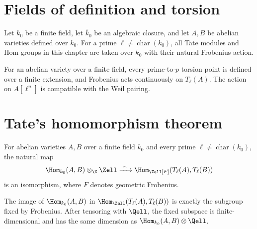 \section{Fields of definition and torsion}
\label{mumford-AppI-setup}

\begin{convention}
\label{mumford-conv-tate-fields}
Let $k_0$ be a finite field, let $\bar k_0$ be an algebraic closure, and let
$A,B$ be abelian varieties defined over $k_0$.  For a prime $\ell\ne
\operatorname{char}(k_0)$, all Tate modules and Hom groups in this chapter
are taken over $\bar k_0$ with their natural Frobenius action.
\notready
\end{convention}

\begin{lemma}
\label{mumford-lem-torsion-defined-over-finite-field}
For an abelian variety over a finite field, every prime-to-$p$ torsion point is
defined over a finite extension, and Frobenius acts continuously on
$T_\ell(A)$.  The action on $A[\ell^n]$ is compatible with the Weil pairing.
\notready
\end{lemma}

\section{Tate's homomorphism theorem}
\label{mumford-AppI-tate-hom}

\begin{theorem}
\label{mumford-thm-tate-hom-isomorphism}
For abelian varieties $A,B$ over a finite field $k_0$ and every prime
$\ell\ne\operatorname{char}(k_0)$, the natural map
\[
 \Hom_{k_0}(A,B)\otimes_\Z\Zell
 \xrightarrow{\ \sim\ }
 \Hom_{\Zell[F]}(T_\ell(A),T_\ell(B))
\]
is an isomorphism, where $F$ denotes geometric Frobenius.
\notready
\end{theorem}

\begin{lemma}
\label{mumford-lem-frobenius-fixed-hom}
The image of $\Hom_{k_0}(A,B)$ in
$\Hom_{\Zell}(T_\ell(A),T_\ell(B))$ is exactly the subgroup fixed by Frobenius.
After tensoring with $\Qell$, the fixed subspace is finite-dimensional and
has the same dimension as $\Hom_{k_0}(A,B)\otimes\Qell$.
\notready
\end{lemma}


